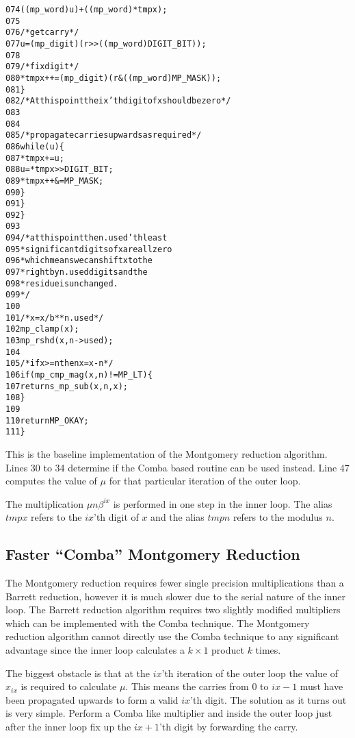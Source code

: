 \documentclass[b5paper]{book}
\begin{document}
\begin{small}
\begin{alltt}
074                     ((mp_word) u) + ((mp_word) * tmpx);
075   
076           /* get carry */
077           u       = (mp_digit)(r >> ((mp_word) DIGIT_BIT));
078   
079           /* fix digit */
080           *tmpx++ = (mp_digit)(r & ((mp_word) MP_MASK));
081         \}
082         /* At this point the ix'th digit of x should be zero */
083   
084   
085         /* propagate carries upwards as required*/
086         while (u) \{
087           *tmpx   += u;
088           u        = *tmpx >> DIGIT_BIT;
089           *tmpx++ &= MP_MASK;
090         \}
091       \}
092     \}
093   
094     /* at this point the n.used'th least
095      * significant digits of x are all zero
096      * which means we can shift x to the
097      * right by n.used digits and the
098      * residue is unchanged.
099      */
100   
101     /* x = x/b**n.used */
102     mp_clamp(x);
103     mp_rshd (x, n->used);
104   
105     /* if x >= n then x = x - n */
106     if (mp_cmp_mag (x, n) != MP_LT) \{
107       return s_mp_sub (x, n, x);
108     \}
109   
110     return MP_OKAY;
111   \}
\end{alltt}
\end{small}

This is the baseline implementation of the Montgomery reduction algorithm.  Lines 30 to 34 determine if the Comba based
routine can be used instead.  Line 47 computes the value of $\mu$ for that particular iteration of the outer loop.  

The multiplication $\mu n \beta^{ix}$ is performed in one step in the inner loop.  The alias $tmpx$ refers to the $ix$'th digit of $x$ and
the alias $tmpn$ refers to the modulus $n$.  

\subsection{Faster ``Comba'' Montgomery Reduction}

The Montgomery reduction requires fewer single precision multiplications than a Barrett reduction, however it is much slower due to the serial
nature of the inner loop.  The Barrett reduction algorithm requires two slightly modified multipliers which can be implemented with the Comba
technique.  The Montgomery reduction algorithm cannot directly use the Comba technique to any significant advantage since the inner loop calculates
a $k \times 1$ product $k$ times. 

The biggest obstacle is that at the $ix$'th iteration of the outer loop the value of $x_{ix}$ is required to calculate $\mu$.  This means the 
carries from $0$ to $ix - 1$ must have been propagated upwards to form a valid $ix$'th digit.  The solution as it turns out is very simple.  
Perform a Comba like multiplier and inside the outer loop just after the inner loop fix up the $ix + 1$'th digit by forwarding the carry.  
\end{document}
